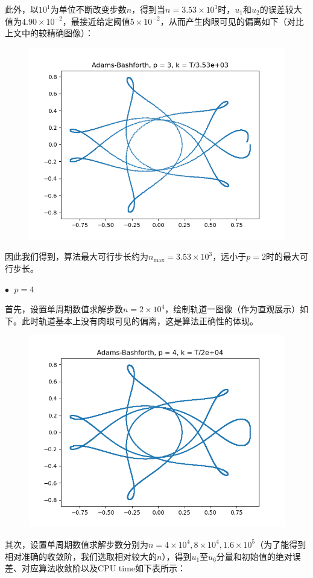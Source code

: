 \documentclass{ctexart}
\begin{document}
\begin{sloppypar}
此外，以$10^1$为单位不断改变步数$n$，得到当$n = 3.53 \times 10^3$时，$u_1$和$u_2$的误差较大值为$4.90 \times 10^{-2}$，最接近给定阈值$5 \times 10^{-2}$，从而产生肉眼可见的偏离如下（对比上文中的较精确图像）：
\begin{figure}[H]
\centering
\includegraphics[scale = 0.45]{./report_src/Figure_45.png}
\end{figure}
因此我们得到，算法最大可行步长约为$n_{\max} = 3.53 \times 10^3$，远小于$p=2$时的最大可行步长。

$\bullet \;$ $p = 4$

首先，设置单周期数值求解步数$n = 2 \times 10^4$，绘制轨道一图像（作为直观展示）如下。此时轨道基本上没有肉眼可见的偏离，这是算法正确性的体现。
\begin{figure}[H]
\centering
\includegraphics[scale = 0.45]{./report_src/Figure_46.png}
\end{figure}
其次，设置单周期数值求解步数分别为$n = 4 \times 10^4,8 \times 10^4,1.6 \times 10^5$（为了能得到相对准确的收敛阶，我们选取相对较大的$n$），得到$u_1$至$u_6$分量和初始值的绝对误差、对应算法收敛阶以及CPU time如下表所示：


\end{sloppypar}
\end{document}
